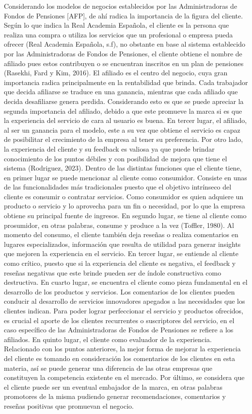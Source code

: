 Considerando los modelos de negocios establecidos por las Administradoras de Fondos de Pensiones [AFP], de ahí radica la importancia de la figura del cliente. Según lo que indica la Real Academia Española, el cliente es la persona que realiza una compra o utiliza los servicios que un profesional o empresa pueda ofrecer (Real Academia Española, s.f), no obstante en base al sistema establecido por las Administradoras de Fondos de Pensiones, el cliente obtiene el nombre de afiliado pues estos contribuyen o se encuentran inscritos en un plan de pensiones (Rasekhi, Fard y Kim, 2016). 
El afiliado es el centro del negocio, cuya gran importancia radica principalmente en la rentabilidad que brinda. Cada trabajador que decida afiliarse se traduce en una ganancia, mientras que cada afiliado que decida desafiliarse genera perdida. Considerando esto es que se puede apreciar la segunda importancia del afiliado, debido a que este promueve la marca si es que la experiencia del servicio de cara al usuario es buena. En tercer lugar, el afiliado, al ser un ganancia para el modelo, este a su vez que obtiene el servicio es capaz de posibilitar el crecimiento de la empresa al tener su preferencia. Por otro lado, la experiencia del cliente y su feedback es valiosa ya que puede brindar conocimiento de los puntos débiles y con posibilidad de mejora que tiene el sistema (Rodriguez, 2023). 
Dentro de las distintas funciones que el cliente tiene, en primer lugar se puede mencionar al cliente como consumidor. Consiste en unas de las funcionalidades más tradicionales puesto que el objetivo intrínseco del cliente es consumir o contratar servicios. Como consumidor es quien adquiere un producto o servicio y lo aprovecha para un fin o necesidad, por lo que la empresa obtiene su principal fuente de ingresos.
En segundo lugar, se tiene al cliente como prosumidor, en otras palabras, consume y produce a la vez (Toffler, 1980). Al momento del consumo, el cliente también deja reseñas o realiza comentarios en lugares especializados, información que resulta de utilidad para generar insights que mejoren la experiencia en el servicio. 
En tercer lugar, se entiende al cliente como crítico, puesto que si la experiencia del cliente es negativa, el feedback y reseñas negativas que este brinde pueden ser de índole constructiva como destructiva. 
En cuarto lugar, se encuentra el cliente como pieza fundamental en el desarrollo de los productos y servicios. Los comentarios de los clientes pueden conducir al desarrollo de servicios innovadores apegados a las necesidades que los clientes indican. Para poder lograr perfeccionar el servicio y productos ofrecidos, es crucial el aporte de los clientes recurrentes o suscriptores del servicio, en el caso específico de las Administradoras de Fondos de Pensiones se refiere a los afiliados. 
En quinto lugar, el cliente como evaluador de la experiencia. Relacionado con los puntos anteriores, la mejor forma de mejorar la experiencia del cliente es tomando en consideración los comentarios de los clientes en esta materia, así se puede generar una diferencia de las otras empresas que constituyen la competencia existente en el mercado. 
Por último, se considera que el cliente puede ser un eventual embajador de la marca, en otras palabras promotores de la misma pudiendo generar recomendaciones, comentarios y reseñas positivas que promuevan el negocio. 
